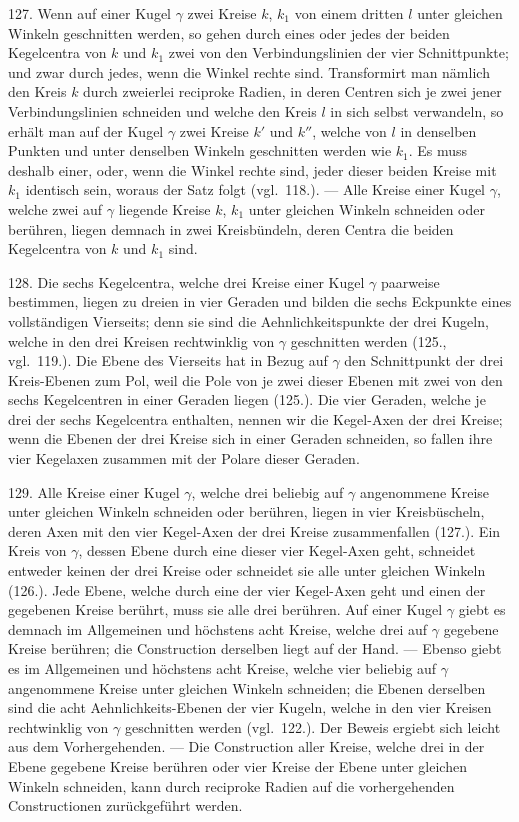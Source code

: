 127. Wenn auf einer Kugel $\gamma$ zwei Kreise $k$, $k_1$ von
einem dritten $l$ unter gleichen Winkeln geschnitten werden,
so gehen durch eines oder jedes der beiden Kegelcentra
von $k$ und $k_1$ zwei von den Verbindungslinien der vier Schnittpunkte;
und zwar durch jedes, wenn die Winkel rechte sind.
Transformirt man n\"amlich den Kreis $k$ durch zweierlei reciproke
Radien, in deren Centren sich je zwei jener Verbindungslinien
schneiden und welche den Kreis $l$ in sich selbst
verwandeln, so erh\"alt man auf der Kugel $\gamma$ zwei Kreise $k'$
und $k''$, welche von $l$ in denselben Punkten und unter denselben
Winkeln geschnitten werden wie $k_1$. Es muss deshalb
einer, oder, wenn die Winkel rechte sind, jeder dieser
beiden Kreise mit $k_1$ identisch sein, woraus der Satz folgt (vgl.\
118.). --- Alle Kreise einer Kugel $\gamma$, welche zwei auf $\gamma$ liegende
Kreise $k$, $k_1$ unter gleichen Winkeln schneiden oder ber\"uhren,
liegen demnach in zwei Kreisb\"undeln, deren Centra die beiden
Kegelcentra von $k$ und $k_1$ sind.

128. Die sechs Kegelcentra, welche drei Kreise einer
Kugel $\gamma$ paarweise bestimmen, liegen zu dreien in vier Geraden
und bilden die sechs Eckpunkte eines vollst\"andigen Vierseits;
denn sie sind die Aehnlichkeitspunkte der drei Kugeln, welche
in den drei Kreisen rechtwinklig von $\gamma$ geschnitten werden
(125., vgl.\ 119.). Die Ebene des Vierseits hat in Bezug
auf $\gamma$ den Schnittpunkt der drei Kreis-Ebenen zum Pol, weil
die Pole von je zwei dieser Ebenen mit zwei von den sechs
Kegelcentren in einer Geraden liegen (125.). Die vier Geraden,
welche je drei der sechs Kegelcentra enthalten, nennen wir
die {\glqq}Kegel-Axen{\grqq} der drei Kreise; wenn die Ebenen der drei
Kreise sich in einer Geraden schneiden, so fallen ihre vier
Kegelaxen zusammen mit der Polare dieser Geraden.

129. Alle Kreise einer Kugel $\gamma$, welche drei beliebig
auf $\gamma$ angenommene Kreise unter gleichen Winkeln schneiden
oder ber\"uhren, liegen in vier Kreisb\"uscheln, deren Axen mit
den vier Kegel-Axen der drei Kreise zusammenfallen (127.).
Ein Kreis von $\gamma$, dessen Ebene durch eine dieser vier Kegel-Axen
geht, schneidet entweder keinen der drei Kreise oder
schneidet sie alle unter gleichen Winkeln (126.). Jede Ebene,
welche durch eine der vier Kegel-Axen geht und einen der
gegebenen Kreise ber\"uhrt, muss sie alle drei ber\"uhren. Auf
einer Kugel $\gamma$ giebt es demnach im Allgemeinen und h\"ochstens
acht Kreise, welche drei auf $\gamma$ gegebene Kreise ber\"uhren;
die Construction derselben liegt auf der Hand. --- Ebenso
giebt es im Allgemeinen und h\"ochstens acht Kreise,
welche vier beliebig auf $\gamma$ angenommene Kreise unter gleichen
Winkeln schneiden; die Ebenen derselben sind die acht
Aehnlichkeits-Ebenen der vier Kugeln, welche in den vier Kreisen
rechtwinklig von $\gamma$ geschnitten werden (vgl.\ 122.). Der Beweis
ergiebt sich leicht aus dem Vorhergehenden. --- Die
Construction aller Kreise, welche drei in der Ebene gegebene
Kreise ber\"uhren oder vier Kreise der Ebene unter gleichen
Winkeln schneiden, kann durch reciproke Radien auf die
vorhergehenden Constructionen zur\"uckgef\"uhrt werden.

